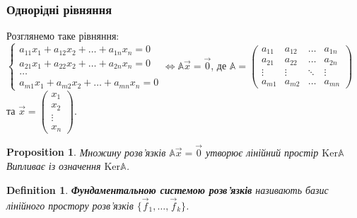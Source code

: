 \documentclass[a4paper, 10pt]{article}
\def\ker#1{\textrm{Ker} {#1}}
\theoremstyle{theoremdd}
\theoremstyle{theoremdd}
\newtheorem{definition}[theorem]{Definition}
\theoremstyle{theoremdd}
\theoremstyle{theoremdd}
\theoremstyle{theoremdd}
\newtheorem{proposition}[theorem]{Proposition}
\theoremstyle{theoremdd}
\theoremstyle{theoremdd}
\theoremstyle{theoremdd}
\begin{document}
\subsubsection*{Однорідні рівняння}
Розглянемо таке рівняння:\\
$\begin{cases}
a_{11}x_1 + a_{12}x_2 + \dots + a_{1n}x_n = 0\\
a_{21}x_1 + a_{22}x_2 + \dots + a_{2n}x_n = 0\\
\dots \\
a_{m1}x_1 + a_{m2}x_2 + \dots + a_{mn}x_n = 0
\end{cases} \iff \mathbb{A} \vec{x} = \vec{0}
$,
де $\mathbb{A} = \begin{pmatrix}
a_{11} & a_{12} & \dots & a_{1n} \\
a_{21} & a_{22} & \dots & a_{2n} \\
\vdots & \vdots & \ddots & \vdots \\
a_{m1} & a_{m2} & \dots & a_{mn}
\end{pmatrix}$ та $\vec{x} = \begin{pmatrix}
x_1 \\ x_2 \\ \vdots \\ x_n
\end{pmatrix}$.

\begin{proposition}
Множину розв'язків $\mathbb{A} \vec{x} = \vec{0}$ утворює лінійний простір $\ker { \mathbb{A}}$\\
\textit{Випливає із означення $\ker { \mathbb{A}}$.}
\end{proposition}

\begin{definition}
\textbf{Фундаментальною системою розв'язків} називають базис лінійного простору розв'язків $\{\vec{f}_1,\dots,\vec{f}_k\}$.
\end{definition}
\end{document}
